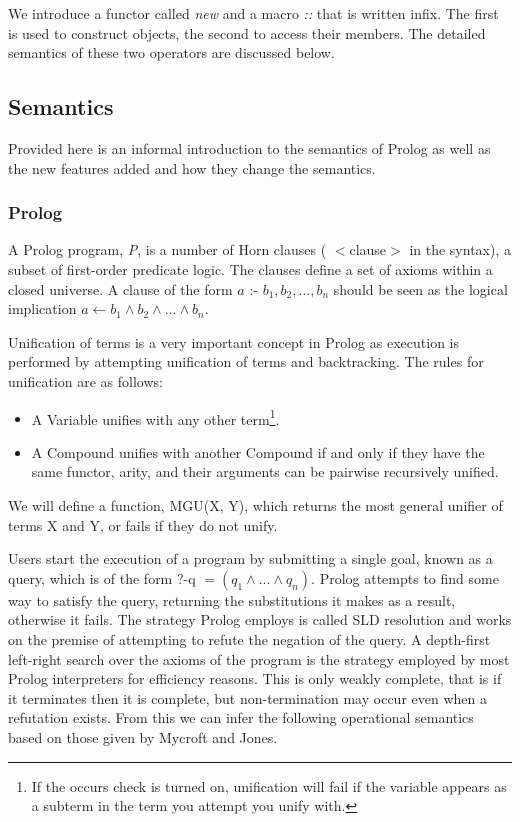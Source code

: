 \documentclass[12pt,a4paper,twoside,openright]{report}
\begin{document}
We introduce a functor called \emph{new} and a macro \emph{::} that is written infix. The first is used to construct objects, the second to access their members. The detailed semantics of these two operators are discussed below.

\subsection {Semantics}

Provided here is an informal introduction to the semantics of Prolog as well as the new features added and how they change the semantics.

\subsubsection {Prolog}

A Prolog program, \emph{P}, is a number of Horn clauses ( $<$clause$>$ in the syntax), a subset of first-order predicate logic. The clauses define a set of axioms within a closed universe. A clause of the form $a$ :- $b_1, b_2, ..., b_n$ should be seen as the logical implication $a \leftarrow b_1 \land b_2 \land ... \land b_n$. 

\bigskip

Unification of terms is a very important concept in Prolog as execution is performed by attempting unification of terms and backtracking. The rules for unification are as follows:

\begin{itemize}
	\item A Variable unifies with any other term\footnote{If the occurs check is turned on, unification will fail if the variable appears as a subterm in the term you attempt you unify with.}.
 	\item A Compound unifies with another Compound if and only if they have the same functor, arity, and their arguments can be pairwise recursively unified.
\end{itemize}

We will define a function, MGU(X, Y), which returns the most general unifier of terms X and Y, or fails if they do not unify.

\bigskip

Users start the execution of a program by submitting a single goal, known as a query, which is of the form ?-q $ = (q_1 \land ... \land q_n)$. Prolog attempts to find some way to satisfy the query, returning the substitutions it makes as a result, otherwise it fails. The strategy Prolog employs is called SLD resolution and works on the premise of attempting to refute the negation of the query. A depth-first left-right search over the axioms of the program is the strategy employed by most Prolog interpreters for efficiency reasons. This is only weakly complete, that is if it terminates then it is complete, but non-termination may occur even when a refutation exists. From this we can infer the following operational semantics based on those given by Mycroft and Jones\cite{MYCROFT}.
\end{document}
